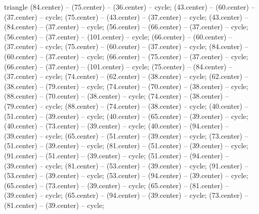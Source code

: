 \begin{pgfonlayer}{triangle}
 (84.center) -- (75.center) -- (36.center) -- cycle; 
 (43.center) -- (60.center) -- (37.center) -- cycle; 
 (75.center) -- (43.center) -- (37.center) -- cycle; 
 (43.center) -- (84.center) -- (37.center) -- cycle; 
 (56.center) -- (66.center) -- (37.center) -- cycle; 
 (56.center) -- (37.center) -- (101.center) -- cycle; 
 (66.center) -- (60.center) -- (37.center) -- cycle; 
 (75.center) -- (60.center) -- (37.center) -- cycle; 
 (84.center) -- (60.center) -- (37.center) -- cycle; 
 (66.center) -- (75.center) -- (37.center) -- cycle; 
 (66.center) -- (37.center) -- (101.center) -- cycle; 
 (75.center) -- (84.center) -- (37.center) -- cycle; 
 (74.center) -- (62.center) -- (38.center) -- cycle; 
 (62.center) -- (38.center) -- (79.center) -- cycle; 
 (74.center) -- (70.center) -- (38.center) -- cycle; 
 (88.center) -- (70.center) -- (38.center) -- cycle; 
 (74.center) -- (38.center) -- (79.center) -- cycle; 
 (88.center) -- (74.center) -- (38.center) -- cycle; 
 (40.center) -- (51.center) -- (39.center) -- cycle; 
 (40.center) -- (65.center) -- (39.center) -- cycle; 
 (40.center) -- (73.center) -- (39.center) -- cycle; 
 (40.center) -- (94.center) -- (39.center) -- cycle; 
 (65.center) -- (51.center) -- (39.center) -- cycle; 
 (73.center) -- (51.center) -- (39.center) -- cycle; 
 (81.center) -- (51.center) -- (39.center) -- cycle; 
 (91.center) -- (51.center) -- (39.center) -- cycle; 
 (51.center) -- (94.center) -- (39.center) -- cycle; 
 (81.center) -- (53.center) -- (39.center) -- cycle; 
 (91.center) -- (53.center) -- (39.center) -- cycle; 
 (53.center) -- (94.center) -- (39.center) -- cycle; 
 (65.center) -- (73.center) -- (39.center) -- cycle; 
 (65.center) -- (81.center) -- (39.center) -- cycle; 
 (65.center) -- (94.center) -- (39.center) -- cycle; 
 (73.center) -- (81.center) -- (39.center) -- cycle; 

\end{pgfonlayer}
